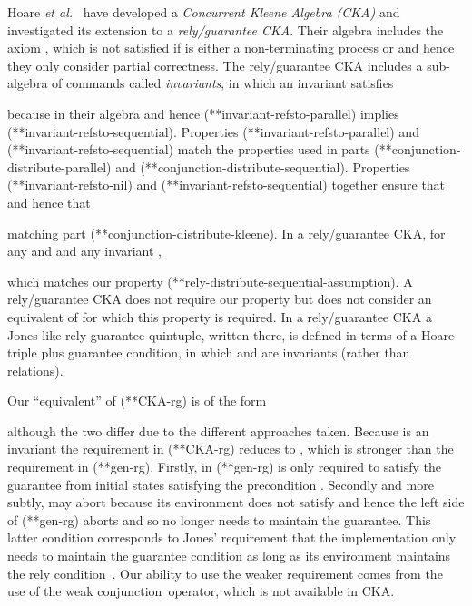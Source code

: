 \documentclass[fleqn]{fac}
\makeatletter
\def\refproperty{\@ifnextchar*{\@refproperty}{\@@refproperty}}
\def\@refproperty*#1{\ref{property-#1}\index{Property!#1|LawUse}}
\def\@@refproperty#1{property~(\ref{property-#1})\index{Property!#1|LawUse}}
\newcommand{\strictconjunction}{weak conjunction}
\makeatother
\begin{document}
\begin{definitionx}[iteration]
\begin{lemmax}[induction]
Hoare {\it et al.}\ \cite{DBLP:journals/jlp/HoareMSW11} have developed a \emph{Concurrent Kleene Algebra (CKA)} 
and investigated its extension to a \emph{rely/guarantee CKA}.
Their algebra includes the axiom ,
which is not satisfied if  is either a non-terminating process or 
and hence they only consider partial correctness.
The rely/guarantee CKA includes a sub-algebra of commands called \emph{invariants},
in which an invariant  satisfies

because in their algebra  and hence 
(\refproperty*{invariant-refsto-parallel}) implies (\refproperty*{invariant-refsto-sequential}).
Properties (\refproperty*{invariant-refsto-parallel}) and (\refproperty*{invariant-refsto-sequential}) match
the properties 
used in  parts (\refproperty*{conjunction-distribute-parallel}) and (\refproperty*{conjunction-distribute-sequential}).
Properties (\refproperty*{invariant-refsto-nil}) and (\refproperty*{invariant-refsto-sequential}) together 
ensure that  and hence that 

matching  part (\refproperty*{conjunction-distribute-kleene}).
In a rely/guarantee CKA, for any  and  and any invariant , 

which matches our property (\refproperty*{rely-distribute-sequential-assumption}).
A rely/guarantee CKA does not require our property  
but \cite{DBLP:journals/jlp/HoareMSW11} does not consider an equivalent of 
for which this property is required.
In a rely/guarantee CKA 
a Jones-like rely-guarantee quintuple,
written  there, 
is defined in terms of a Hoare triple plus guarantee condition,
in which  and  are invariants (rather than relations).

Our ``equivalent'' of (\refproperty*{CKA-rg}) is of the form

although the two differ due to the different approaches taken.
Because  is an invariant 
the requirement  in (\refproperty*{CKA-rg}) reduces to ,
which is stronger than the requirement in (\refproperty*{gen-rg}). 
Firstly, in (\refproperty*{gen-rg})  is only required to satisfy the guarantee from initial states satisfying the precondition .
Secondly and more subtly,  may abort 
because its environment does not satisfy  and 
hence the left side of (\refproperty*{gen-rg}) aborts and so  no longer needs to maintain the guarantee.
This latter condition corresponds to Jones' requirement that the implementation only needs to maintain
the guarantee condition as long as its environment maintains the rely condition~\cite{jon83a}.
Our ability to use the weaker requirement comes from the use of the \strictconjunction\ operator,
which is not available in CKA.




\end{lemmax}
\end{definitionx}
\end{document}

